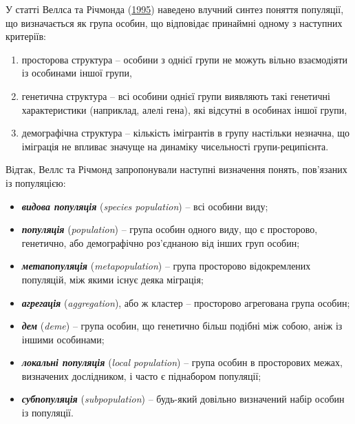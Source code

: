 \documentclass[
  11pt,
]{book}
\begin{document}
У статті Веллса та Річмонда (\href{https://www.researchgate.net/publication/281243816}{1995}) наведено влучний синтез поняття популяції, що визначається як група особин, що відповідає принаймні одному з наступних критеріїв:

\begin{enumerate}
\def\labelenumi{\arabic{enumi}.}
\item
  просторова структура -- особини з однієї групи не можуть вільно взаємодіяти із особинами іншої групи,
\item
  генетична структура -- всі особини однієї групи виявляють такі генетичні характеристики (наприклад, алелі гена), які відсутні в особинах іншої групи,
\item
  демографічна структура -- кількість імігрантів в групу настільки незначна, що іміграція не впливає значуще на динаміку чисельності групи-реципієнта.
\end{enumerate}

Відтак, Веллс та Річмонд запропонували наступні визначення понять, пов'язаних із популяцією:

\begin{itemize}
\item
  \textbf{\emph{видова популяція}} (\emph{species population}) -- всі особини виду;
\item
  \textbf{\emph{популяція}} (\emph{population}) -- група особин одного виду, що є просторово, генетично, або демографічно роз'єднаною від інших груп особин;
\item
  \textbf{\emph{метапопуляція}} (\emph{metapopulation}) -- група просторово відокремлених популяцій, між якими існує деяка міграція;
\item
  \textbf{\emph{агрегація}} (\emph{aggregation}), або ж кластер -- просторово агрегована група особин;
\item
  \textbf{\emph{дем}} (\emph{deme}) -- група особин, що генетично більш подібні між собою, аніж із іншими особинами;
\item
  \textbf{\emph{локальні популяція}} (\emph{local population}) -- група особин в просторових межах, визначених дослідником, і часто є піднабором популяції;
\item
  \textbf{\emph{субпопуляція}} (\emph{subpopulation}) -- будь-який довільно визначений набір особин із популяції.
\end{itemize}
\end{document}
